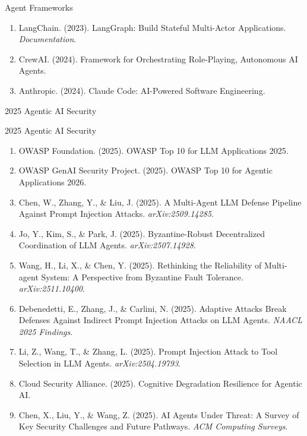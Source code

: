 \documentclass[
  ignorenonframetext,
]{beamer}
\begin{document}
\begin{frame}[allowframebreaks]{Agent Frameworks}
\begin{enumerate}
\item
  LangChain. (2023). LangGraph: Build Stateful Multi-Actor Applications.
  \emph{Documentation}.
\item
  CrewAI. (2024). Framework for Orchestrating Role-Playing, Autonomous
  AI Agents.
\item
  Anthropic. (2024). Claude Code: AI-Powered Software Engineering.
\end{enumerate}
\end{frame}

\begin{frame}[allowframebreaks]{2025 Agentic AI Security}
\protect{}\label{agentic-ai-security}
\end{frame}

\begin{frame}[allowframebreaks]{2025 Agentic AI Security}
\begin{enumerate}
\item
  OWASP Foundation. (2025). OWASP Top 10 for LLM Applications 2025.
\item
  OWASP GenAI Security Project. (2025). OWASP Top 10 for Agentic
  Applications 2026.
\item
  Chen, W., Zhang, Y., \& Liu, J. (2025). A Multi-Agent LLM Defense
  Pipeline Against Prompt Injection Attacks. \emph{arXiv:2509.14285}.
\item
  Jo, Y., Kim, S., \& Park, J. (2025). Byzantine-Robust Decentralized
  Coordination of LLM Agents. \emph{arXiv:2507.14928}.
\item
  Wang, H., Li, X., \& Chen, Y. (2025). Rethinking the Reliability of
  Multi-agent System: A Perspective from Byzantine Fault Tolerance.
  \emph{arXiv:2511.10400}.
\item
  Debenedetti, E., Zhang, J., \& Carlini, N. (2025). Adaptive Attacks
  Break Defenses Against Indirect Prompt Injection Attacks on LLM
  Agents. \emph{NAACL 2025 Findings}.
\item
  Li, Z., Wang, T., \& Zhang, L. (2025). Prompt Injection Attack to Tool
  Selection in LLM Agents. \emph{arXiv:2504.19793}.
\item
  Cloud Security Alliance. (2025). Cognitive Degradation Resilience for
  Agentic AI.
\item
  Chen, X., Liu, Y., \& Wang, Z. (2025). AI Agents Under Threat: A
  Survey of Key Security Challenges and Future Pathways. \emph{ACM
  Computing Surveys}.
\end{enumerate}
\end{frame}
\end{document}
